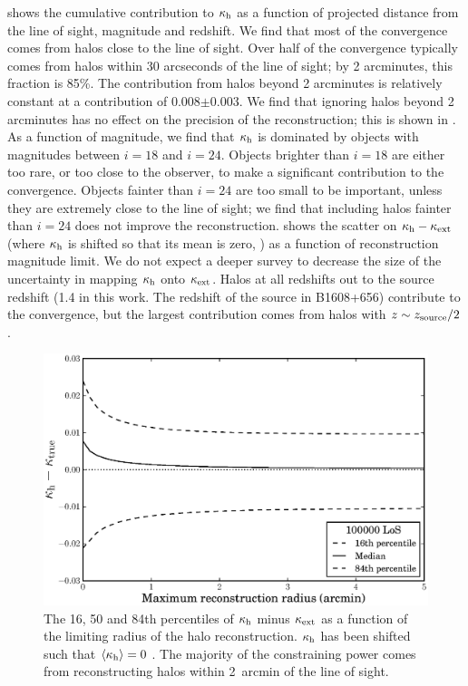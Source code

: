 \documentclass[useAMS,usenatbib,a4paper]{mn2e}
\begin{document}
 shows the cumulative contribution to $\kappa_{\rm h}$ as a function
of projected distance from the line of sight, magnitude and redshift. We find
that most of the convergence comes from halos close to the line of sight. 
Over half of the  convergence typically comes from halos within 30 arcseconds
of the line of sight; by 2 arcminutes, this fraction is 85\%. The contribution
from halos beyond 2 arcminutes is relatively constant at a contribution of
0.008$\pm$0.003. We find that ignoring halos beyond 2 arcminutes has no effect
on the precision of the reconstruction; this is shown in . As
a function of magnitude, we find that $\kappa_{\rm h}$ is dominated by objects with
magnitudes between $i=18$ and $i=24$. Objects brighter than $i=18$ are either
too rare, or too close to the observer, to make a significant contribution to
the convergence. Objects fainter than $i=24$ are too small to be important,
unless they are extremely close to the line of sight; we find that
including halos fainter than $i=24$ does not improve the reconstruction. 
 shows the scatter on $\kappa_{\rm h}-\kappa_{\rm ext}$ (where $\kappa_{\rm h}$ is
shifted so that its mean is zero, ) as a function of reconstruction magnitude limit. We do not
expect a deeper survey to decrease the size of the uncertainty in mapping
$\kappa_{\rm h}$ onto $\kappa_{\rm ext}$. Halos at all redshifts out to the source redshift
(1.4 in this work. The redshift of the source in B1608+656) contribute to the convergence, but the largest contribution comes
from halos with $z \sim z_{\rm source}/2$.

\begin{figure}
\includegraphics[width=\columnwidth]{figs/radius_scatter.eps}
\caption[magcut]{The 16, 50 and 84th percentiles of $\kappa_{\rm h}$ minus
$\kappa_{\rm ext}$ as a function of the limiting radius of the halo
reconstruction. $\kappa_{\rm h}$ has been shifted such that
$\left\langle\kappa_{\rm h}\right\rangle=0$ . 
The majority of the constraining power
comes from reconstructing halos within 2~arcmin of the line of sight.}
\label{fig:radcut}
\end{figure}
\end{document}
